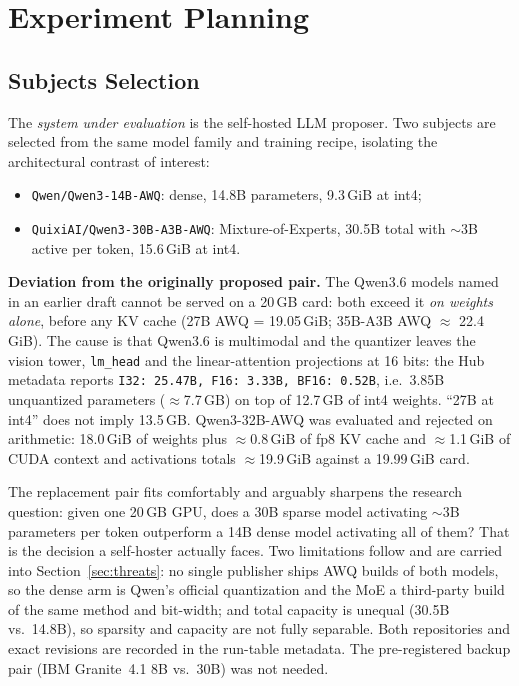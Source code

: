 \section{Experiment Planning}\label{sec:planning}

\subsection{Subjects Selection}

The \emph{system under evaluation} is the self-hosted LLM proposer. Two subjects are selected from the same model family and training recipe, isolating the architectural contrast of interest:

\begin{itemize}[leftmargin=1.2em]
\item \texttt{Qwen/Qwen3-14B-AWQ}: dense, 14.8B parameters, 9.3\,GiB at int4;
\item \texttt{QuixiAI/Qwen3-30B-A3B-AWQ}: Mixture-of-Experts, 30.5B total with $\sim$3B active per token, 15.6\,GiB at int4.
\end{itemize}

\textbf{Deviation from the originally proposed pair.} The Qwen3.6 models named in an earlier draft cannot be served on a 20\,GB card: both exceed it \emph{on weights alone}, before any KV cache (27B AWQ = 19.05\,GiB; 35B-A3B AWQ $\approx$ 22.4\,GiB). The cause is that Qwen3.6 is multimodal and the quantizer leaves the vision tower, \texttt{lm\_head} and the linear-attention projections at 16 bits: the Hub metadata reports \texttt{I32: 25.47B, F16: 3.33B, BF16: 0.52B}, i.e.\ 3.85B unquantized parameters ($\approx$7.7\,GB) on top of 12.7\,GB of int4 weights. ``27B at int4'' does not imply 13.5\,GB. Qwen3-32B-AWQ was evaluated and rejected on arithmetic: 18.0\,GiB of weights plus $\approx$0.8\,GiB of fp8 KV cache and $\approx$1.1\,GiB of CUDA context and activations totals $\approx$19.9\,GiB against a 19.99\,GiB card.

The replacement pair fits comfortably and arguably sharpens the research question: given one 20\,GB GPU, does a 30B sparse model activating $\sim$3B parameters per token outperform a 14B dense model activating all of them? That is the decision a self-hoster actually faces. Two limitations follow and are carried into Section~\ref{sec:threats}: no single publisher ships AWQ builds of both models, so the dense arm is Qwen's official quantization and the MoE a third-party build of the same method and bit-width; and total capacity is unequal (30.5B vs.\ 14.8B), so sparsity and capacity are not fully separable. Both repositories and exact revisions are recorded in the run-table metadata. The pre-registered backup pair (IBM Granite~4.1 8B vs.\ 30B) was not needed.

